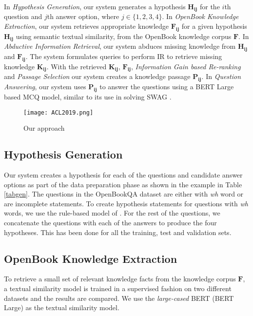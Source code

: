 \documentclass[11pt,a4paper]{article}
\begin{document}
In \textit{Hypothesis Generation}, our system generates a hypothesis $\mathbf{H_{ij}}$ for the $i$th question and $j$th answer option, where $j \in \{1,2,3,4\} $. In \textit{OpenBook Knowledge Extraction}, our system retrieves appropriate knowledge $\mathbf{F_{ij}}$ for a given hypothesis $\mathbf{H_{ij}}$ using semantic textual similarity, from the OpenBook knowledge corpus $\mathbf{F}$. In \textit{Abductive Information Retrieval}, our system abduces missing knowledge from $\mathbf{H_{ij}}$ and $\mathbf{F_{ij}}$. The system formulates queries to perform IR to retrieve missing knowledge $\mathbf{K_{ij}}$.  With the retrieved $\mathbf{K_{ij}}$, $\mathbf{F_{ij}}$, \textit{Information Gain based Re-ranking} and \textit{Passage Selection} our system creates a knowledge passage $\mathbf{P_{ij}}$. In \textit{Question Answering}, our system uses $\mathbf{P_{ij}}$ to answer the questions using a BERT Large based MCQ model, similar to its use in solving SWAG \cite{zellers2018swag}. 
  
 

\begin{figure}
  \texttt{[image: ACL2019.png]}
  \caption{Our approach}
  \label{fig:blk}
\end{figure}

 




\subsection{Hypothesis Generation}
Our system creates a hypothesis for each of the questions and candidate answer options as part of the data preparation phase as shown in the example in Table \ref{tabgen}. The questions in the OpenBookQA
dataset are either with \textit{wh} word or are incomplete statements.
To create hypothesis statements for questions with \textit{wh} words, we use the rule-based model of \citet{demszky2018transforming}. For the rest of the questions, we concatenate the questions with each of the answers to produce the four hypotheses. This has been done for all the training, test and validation sets. 
\subsection{OpenBook Knowledge Extraction}
To retrieve a small set of relevant knowledge facts from the knowledge corpus $\mathbf{F}$, a textual similarity model is trained in a supervised fashion on two different datasets and the results are compared. We use the \textit{large-cased} BERT \cite{devlin2018bert} (BERT Large) as the textual similarity model. 
\end{document}
